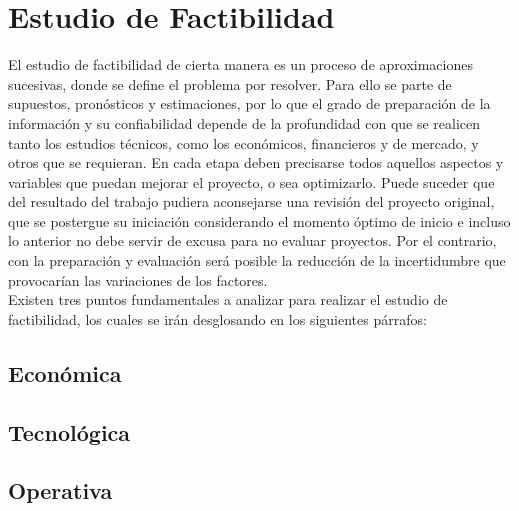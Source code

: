 \section{Estudio de Factibilidad}

El estudio de factibilidad de cierta manera es un proceso de aproximaciones sucesivas, donde se define el problema por resolver. Para ello se parte de supuestos, pronósticos y estimaciones, por lo que el grado de preparación de la información y su confiabilidad depende de la profundidad con que se realicen tanto los estudios técnicos, como los económicos, financieros y de mercado, y otros que se requieran. En cada etapa deben precisarse todos aquellos aspectos y variables que puedan mejorar el proyecto, o sea optimizarlo. Puede suceder que del resultado del trabajo pudiera aconsejarse una revisión del proyecto original, que se postergue su iniciación considerando el momento óptimo de inicio e incluso lo anterior no debe servir de excusa para no evaluar proyectos. Por el contrario, con la preparación y evaluación será posible la reducción de la incertidumbre que provocarían las variaciones de los factores. \cite{16} \\

Existen tres puntos fundamentales a analizar para realizar el estudio de factibilidad, los cuales se irán desglosando en los siguientes párrafos:

\subsection{Económica}

\subsection{Tecnológica}

\subsection{Operativa}
